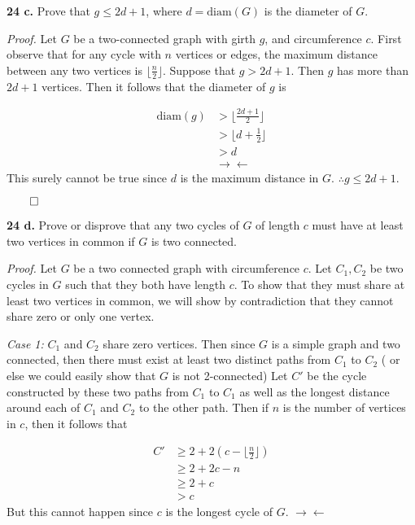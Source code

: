 \documentclass{article}
\begin{document}
\vspace{4mm}

\textbf{24 c.} Prove that \(g\leq 2d+1\), where \(d=\text{diam} (G) \) is the diameter of \(G\).  
\vspace{3mm}

\textit{Proof.} Let \(G\) be a two-connected graph with girth \(g\), and circumference \(c\). First observe that for any cycle with \(n\) vertices or edges, the maximum distance between any two vertices is \(\lfloor \frac n2 \rfloor\). Suppose that \( g>2d+1\). Then \(g \) has more than \(2d+1\) vertices. Then it follows that the diameter of \(g\) is 

\begin{align*}
 \text{diam}(g) &> \lfloor \frac{2d+1}{2} \rfloor \\
 &> \lfloor d + \frac12 \rfloor \\
 &> d\\
 &   \rightarrow\!\leftarrow
\end{align*}
This surely cannot be true since \(d\) is the maximum distance in \(G\). \(\therefore g\leq 2d+1\).
\begin{flushright}
 \(\qed\) 
\end{flushright}

\vspace{4mm}


\textbf{24 d.} Prove or disprove that any two cycles of \(G\) of length \(c\) must have at least two vertices in common if \(G\) is two connected. 
\vspace{3mm}

\textit{Proof.} Let \(G\) be a two connected graph with circumference \(c\). Let \(C_1, C_2\) be two cycles in \(G\) such that they both have length \(c\). To show that they must share at least two vertices in common, we will show by contradiction that they cannot share zero or only one vertex. 

\vspace{2mm}
\textit{Case 1:}  \(C_1\) and \(C_2\) share zero vertices. Then since \(G\) is a simple graph and two connected, then there must exist at least two distinct paths from \(C_1\) to \(C_2\) ( or else we could easily show that \(G\) is not 2-connected) Let \(C'\) be the cycle constructed by these two paths from \(C_1\) to \(C_1\) as well as the longest distance around each of \(C_1\) and \(C_2\) to the other path. Then if \(n\) is the number of vertices in \(c\), then it follows that 

\begin{align*}
C' &\geq 2 + 2( c - \lfloor \frac{n}2 \rfloor ) \\
&\geq  2 + 2c-n\\
&\geq 2 +c \\
&> c
\end{align*}
But this cannot happen since \(c\) is the longest cycle of \(G\). \( \rightarrow\!\leftarrow\)
\end{document}
